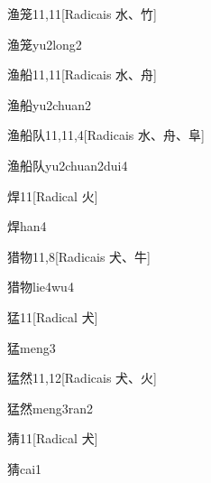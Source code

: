 \begin{entry}{渔笼}{11,11}[Radicais ⽔、⽵]
  \begin{phonetics}{渔笼}{yu2long2}
  \end{phonetics}
\end{entry}

\begin{entry}{渔船}{11,11}[Radicais ⽔、⾈]
  \begin{phonetics}{渔船}{yu2chuan2}
  \end{phonetics}
\end{entry}

\begin{entry}{渔船队}{11,11,4}[Radicais ⽔、⾈、⾩]
  \begin{phonetics}{渔船队}{yu2chuan2dui4}
  \end{phonetics}
\end{entry}

\begin{entry}{焊}{11}[Radical ⽕]
  \begin{phonetics}{焊}{han4}
  \end{phonetics}
\end{entry}

\begin{entry}{猎物}{11,8}[Radicais ⽝、⽜]
  \begin{phonetics}{猎物}{lie4wu4}
  \end{phonetics}
\end{entry}

\begin{entry}{猛}{11}[Radical ⽝]
  \begin{phonetics}{猛}{meng3}
  \end{phonetics}
\end{entry}

\begin{entry}{猛然}{11,12}[Radicais ⽝、⽕]
  \begin{phonetics}{猛然}{meng3ran2}
  \end{phonetics}
\end{entry}

\begin{entry}{猜}{11}[Radical ⽝]
  \begin{phonetics}{猜}{cai1}
  \end{phonetics}
\end{entry}

